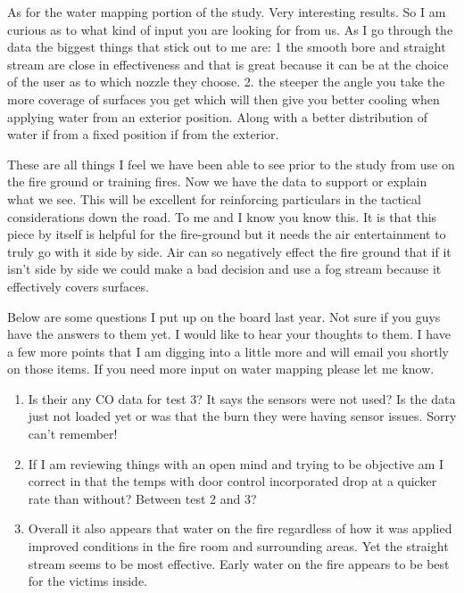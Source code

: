 \documentclass[12pt,oneside]{book}
\begin{document}
\begin{appendix}
As for the water mapping portion of the study.  Very interesting results.  So I am curious as to what kind of input you are looking for from us.  As I go through the data the biggest things that stick out to me are: 
1 the smooth bore and straight stream are close in effectiveness and that is great because it can be at the choice of the user as to which nozzle they choose. 
2. the steeper the angle you take the more coverage of surfaces you get which will then give you better cooling when applying water from an exterior position.  Along with a better distribution of water if from a fixed position if from the exterior.  
 
These are all things I feel we have been able to see prior to the study from use on the fire ground or training fires. Now we have the data to support or explain what we see.  This will be excellent for reinforcing particulars in the tactical considerations down the road.  To me and I know you know this. It is that this piece by itself is helpful for the fire-ground but it needs the air entertainment to truly go with it side by side.  Air can so negatively effect the fire ground that if it isn't side by side we could make a bad decision and use a fog stream because it effectively covers surfaces. 
 
Below are some questions I put up on the board last year.  Not sure if you guys have the answers to them yet.  I would like to hear your thoughts to them.  I have a few more points that I am digging into a little more and will email you shortly on those items. If you need more input on water mapping please let me know.  
 
 
\begin{enumerate}
\item Is their any CO data for test 3? It says the sensors were not used? Is the data just not loaded yet or was that the burn they were having sensor issues. Sorry can't remember!

\item If I am reviewing things with an open mind and trying to be objective am I correct in that the temps with door control incorporated drop at a quicker rate than without? Between test 2 and 3?

\item Overall it also appears that water on the fire regardless of how it was applied improved conditions in the fire room and surrounding areas. Yet the straight stream seems to be most effective. Early water on the fire appears to be best for the victims inside.


\end{enumerate}
\end{appendix}
\end{document}
